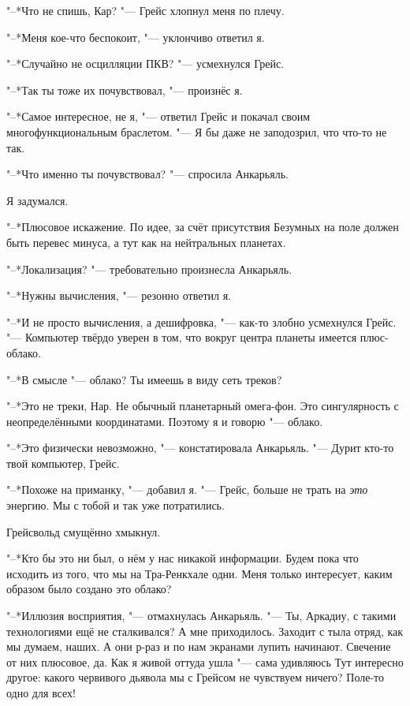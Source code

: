 \documentclass[a4paper,10pt,fleqn]{book}
\newcommand{\ldotst}{\so{...}\xspace}
\begin{document}
"--*Что не спишь, Кар? "--- Грейс хлопнул меня по плечу.

"--*Меня кое-что беспокоит, "--- уклончиво ответил я.

"--*Случайно не осцилляции ПКВ? "--- усмехнулся Грейс.

"--*Так ты тоже их почувствовал, "--- произнёс я.

"--*Самое интересное, не я, "--- ответил Грейс и покачал своим многофункциональным браслетом.
"--- Я бы даже не заподозрил, что что-то не так.

"--*Что именно ты почувствовал? "--- спросила Анкарьяль.

Я задумался.

"--*Плюсовое искажение.
По идее, за счёт присутствия Безумных на поле должен быть перевес минуса, а тут\ldotst как на нейтральных планетах.

"--*Локализация? "--- требовательно произнесла Анкарьяль.

"--*Нужны вычисления, "--- резонно ответил я.

"--*И не просто вычисления, а дешифровка, "--- как-то злобно усмехнулся Грейс.
"--- Компьютер твёрдо уверен в том, что вокруг центра планеты имеется плюс-облако.

"--*В смысле "--- облако?
Ты имеешь в виду сеть треков?

"--*Это не треки, Нар.
Не обычный планетарный омега-фон.
Это сингулярность с неопределёнными координатами.
Поэтому я и говорю "--- облако.

"--*Это физически невозможно, "--- констатировала Анкарьяль.
"--- Дурит кто-то твой компьютер, Грейс.

"--*Похоже на приманку, "--- добавил я.
"--- Грейс, больше не трать на \textit{это} энергию.
Мы с тобой и так уже\ldotst потратились.

Грейсвольд смущённо хмыкнул.

"--*Кто бы это ни был, о нём у нас никакой информации.
Будем пока что исходить из того, что мы на Тра-Ренкхале одни.
Меня только интересует, каким образом было создано это облако?

"--*Иллюзия восприятия, "--- отмахнулась Анкарьяль.
"--- Ты, Аркадиу, с такими технологиями ещё не сталкивался?
А мне приходилось.
Заходит с тыла отряд, как мы думаем, наших.
А они р-раз и по нам экранами лупить начинают.
Свечение от них плюсовое, да.
Как я живой оттуда ушла "--- сама удивляюсь\ldotst
Тут интересно другое: какого червивого дьявола мы с Грейсом не чувствуем ничего?
Поле-то одно для всех!
\end{document}
